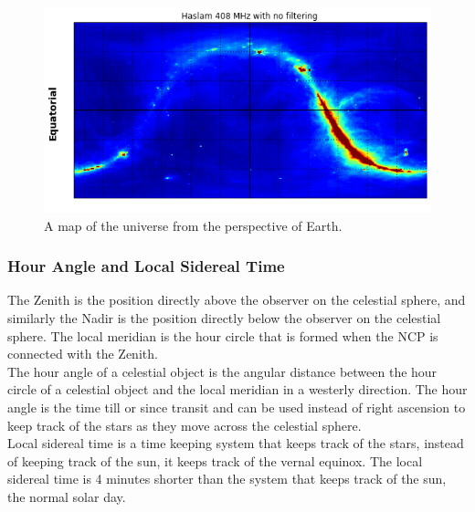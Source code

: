\begin{figure}
    \centering
    \includegraphics[scale=0.7]{images/UNIVERSEMAP.png}
    \caption{A map of the universe from the perspective of Earth\cite{TEXTBOOK}.}
    \label{fig:universe}
\end{figure}
\FloatBarrier
\subsubsection{Hour Angle and Local Sidereal Time}
The Zenith is the position directly above the observer on the celestial sphere, and similarly the Nadir is the position directly below the observer on the celestial sphere. The local meridian is the hour circle that is formed when the NCP is connected with the Zenith. \\ 
The hour angle of a celestial object is the angular distance between the hour circle of a celestial object and the local meridian in a westerly direction. The hour angle is the time till or since transit and can be used instead of right ascension to keep track of the stars as they move across the celestial sphere. \\
Local sidereal time is a time keeping system that keeps track of the stars, instead of keeping track of the sun, it keeps track of the vernal equinox. The local sidereal time is 4 minutes shorter than the system that keeps track of the sun, the normal solar day.
